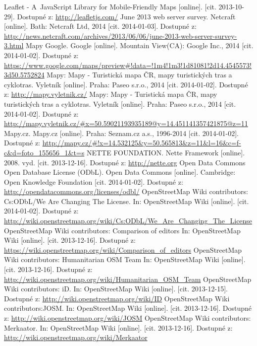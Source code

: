 \documentclass[11pt,a4paper,titlepage,oneside]{book}
\begin{document}
\begin{thebibliography}{99}
		Leaflet - A~JavaScript Library for Mobile-Friendly Maps [online]. [cit. 2013-10-29]. Dostupné z: \url{http://leafletjs.com/}
	June 2013 web server survey. Netcraft [online]. Bath: Netcraft Ltd, 2014 [cit. 2014-01-03]. Dostupné z: \url{http://news.netcraft.com/archives/2013/06/06/june-2013-web-server-survey-3.html}
	Mapy Google. Google [online]. Mountain View(CA): Google Inc., 2014 [cit. 2014-01-02]. Dostupné z: \url{https://www.google.com/maps/preview#!data=!1m4!1m3!1d81081!2d14.4545573!3d50.5752824}
	Mapy: Mapy - Turistická mapa ČR, mapy turistických tras a cyklotras. Vyletník [online]. Praha: Paseo s.r.o., 2014 [cit. 2014-01-02]. Dostupné z: \url{http://mapy.vyletnik.cz/}
	Mapy: Mapy - Turistická mapa ČR, mapy turistických tras a cyklotras. Vyletník [online]. Praha: Paseo s.r.o., 2014 [cit. 2014-01-02]. Dostupné z: \url{http://mapy.vyletnik.cz/#x=50.59021193935189@y=14.451141357421875@z=11}
	Mapy.cz. Mapy.cz [online]. Praha: Seznam.cz a.s., 1996-2014 [cit. 2014-01-02]. Dostupné z: \url{http://mapy.cz/#!x=14.532125&y=50.565813&z=11&l=16&c=f-c&d=foto_155656_1&t=s}	
	NETTE FOUNDATION. Nette Framework [online]. 2008. vyd. [cit. 2013-12-16]. Dostupné z: \url{http://nette.org} 
	Open Data Commons Open Database License (ODbL). Open Data Commons [online]. Cambridge: Open Knowledge Foundation [cit. 2014-01-02]. Dostupné z: \url{http://opendatacommons.org/licenses/odbl/}		
	OpenStreetMap Wiki contributors: Cs:ODbL/We Are Changing The License. In: OpenStreetMap Wiki [online]. [cit. 2014-01-02]. Dostupné z: \url{http://wiki.openstreetmap.org/wiki/Cs:ODbL/We_Are_Changing_The_License}
	OpenStreetMap Wiki contributors: Comparison of editors In: OpenStreetMap Wiki [online]. [cit. 2013-12-16]. Dostupné z:	\url{https://wiki.openstreetmap.org/wiki/Comparison_of_editors}
	OpenStreetMap Wiki contributors: Humanitarian OSM Team  In: OpenStreetMap Wiki [online]. [cit. 2013-12-16]. Dostupné z: \url{http://wiki.openstreetmap.org/wiki/Humanitarian_OSM_Team}
	OpenStreetMap Wiki contributors: iD. In: OpenStreetMap Wiki [online]. [cit. 2013-12-15]. Dostupné z:  \url{http://wiki.openstreetmap.org/wiki/ID}
	OpenStreetMap Wiki contributors:JOSM. In: OpenStreetMap Wiki [online]. [cit. 2013-12-16]. Dostupné z:  \url{http://wiki.openstreetmap.org/wiki/JOSM}
	OpenStreetMap Wiki contributors: Merkaator. In: OpenStreetMap Wiki [online]. [cit. 2013-12-16]. Dostupné z:  \url{http://wiki.openstreetmap.org/wiki/Merkaator}

\end{thebibliography}
\end{document}
